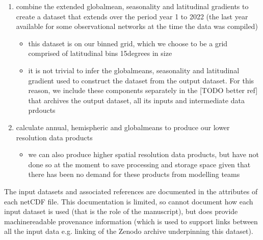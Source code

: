 \documentclass[letterpaper,10pt,english]{jupyterBook}
\begin{document}
\begin{enumerate}
\begin{itemize}
\item {}
\sphinxAtStartPar
the extension varies by gas,
aiming to make use of as much information as is possible
e.g. hemisphere specific ice core information
and the latitudinal gradient
over the period covered by ground\sphinxhyphen{}based observations

\end{itemize}

\item {}
\sphinxAtStartPar
combine the extended global\sphinxhyphen{}mean, seasonality and latitudinal gradients
to create a dataset that extends over the period
year 1 to 2022 (the last year available for some observational networks
at the time the data was compiled)
\begin{itemize}
\item {}
\sphinxAtStartPar
this dataset is on our binned grid,
which we choose to be a grid comprised of latitudinal bins 15\sphinxhyphen{}degrees in size

\item {}
\sphinxAtStartPar
it is not trivial to infer the global\sphinxhyphen{}means,
seasonality and latitudinal gradient used to construct the dataset
from the output dataset. For this reason,
we include these components separately
in the 
{[}TODO better ref{]}
that archives the output dataset,
all its inputs and intermediate data prdoucts

\end{itemize}

\item {}
\sphinxAtStartPar
calculate annual\sphinxhyphen{}, hemispheric\sphinxhyphen{} and global\sphinxhyphen{}means
to produce our lower resolution data products
\begin{itemize}
\item {}
\sphinxAtStartPar
we can also produce higher spatial resolution data products,
but have not done so at the moment to save processing and storage space
given that there has been no demand for these products from modelling teams

\end{itemize}

\end{enumerate}

\sphinxAtStartPar
The input datasets and associated references
are documented in the  attributes of each netCDF file.
This documentation is limited, so cannot document how each input dataset is used
(that is the role of the manuscript),
but does provide machine\sphinxhyphen{}readable provenance information
(which is used to support links between all the input data
e.g. linking of the Zenodo archive underpinning this dataset).
\end{document}
